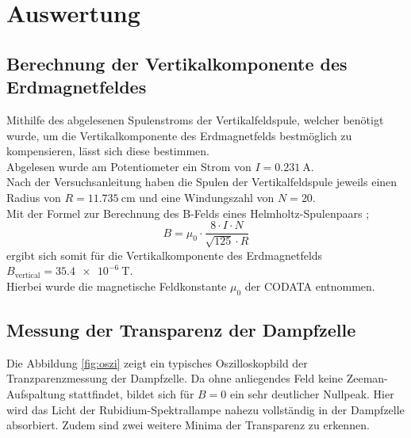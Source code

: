 \section{Auswertung}
\label{sec:Auswertung}
\subsection{Berechnung der Vertikalkomponente des Erdmagnetfeldes}
Mithilfe des abgelesenen Spulenstroms der Vertikalfeldspule, welcher benötigt wurde, um die Vertikalkomponente des Erdmagnetfelds bestmöglich zu kompensieren, lässt sich diese bestimmen.\\
Abgelesen wurde am Potentiometer ein Strom von $I=\SI{0.231}{\ampere}$.\\
Nach der Versuchsanleitung \cite{Anleitung} haben die Spulen der Vertikalfeldspule jeweils einen Radius von $R=\SI{11.735}{\centi\meter}$ und eine Windungszahl von $N=20$.\\
Mit der Formel zur Berechnung des B-Felds eines Helmholtz-Spulenpaars \cite{demtröder};
\begin{equation}
\label{eqn:hholtz}
B=\mu_{\mathrm{0}} \cdot \frac{8\cdot I \cdot N}{\sqrt{125}\cdot R}
\end{equation}
ergibt sich somit für die Vertikalkomponente des Erdmagnetfelds $B_{\mathrm{vertical}}=\SI{35.4e-6}{\tesla}$.\\
Hierbei wurde die magnetische Feldkonstante $\mu_{0}$ der CODATA entnommen. \cite{mu_0}

\subsection{Messung der Transparenz der Dampfzelle}
Die Abbildung \ref{fig:oszi} zeigt ein typisches Oszilloskopbild der Tranzparenzmessung der Dampfzelle.
Da ohne anliegendes Feld keine Zeeman-Aufspaltung stattfindet, bildet sich für $B=0$ ein sehr deutlicher Nullpeak.
Hier wird das Licht der Rubidium-Spektrallampe nahezu vollständig in der Dampfzelle absorbiert. Zudem sind zwei weitere Minima der Transparenz zu erkennen.

